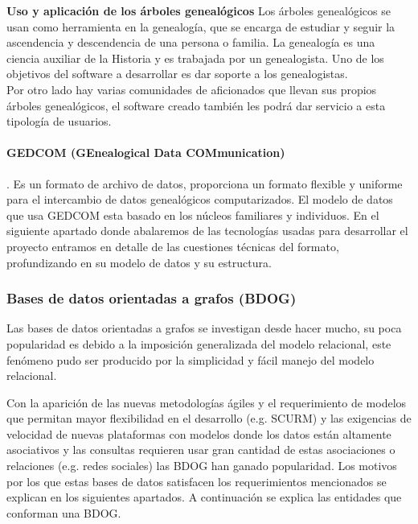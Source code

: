 \textbf{Uso y aplicación de los árboles genealógicos}\newline
Los árboles genealógicos se usan como herramienta en la genealogía, que se encarga de estudiar y seguir la ascendencia y descendencia de una persona o familia. La genealogía es una ciencia auxiliar de la Historia y es trabajada por un genealogista. Uno de los objetivos del software a desarrollar es dar soporte a los genealogistas.\\ Por otro lado hay varias comunidades de aficionados que llevan sus propios árboles genealógicos, el software creado también les podrá dar servicio a esta tipología de usuarios.

\paragraph{GEDCOM \cite{aboutGEDCOM} (\textbf{GE}nealogical \textbf{D}ata \textbf{COM}munication)}.\newline
Es un formato de archivo de datos, proporciona un formato flexible y uniforme para el intercambio de datos genealógicos computarizados. El modelo de datos que usa GEDCOM esta basado en los núcleos familiares y individuos. En el siguiente apartado donde abalaremos de las tecnologías usadas para desarrollar el proyecto entramos en detalle de las cuestiones técnicas del formato, profundizando en su modelo de datos y su estructura.

\subsubsection{Bases de datos orientadas a grafos (BDOG)}
\label{sec:bdog}
Las bases de datos orientadas a grafos se investigan desde hacer mucho, su poca popularidad es debido a la imposición generalizada del modelo relacional, este fenómeno pudo ser producido por la simplicidad y fácil manejo del modelo relacional.

Con la aparición de las nuevas metodologías ágiles y el requerimiento de modelos que permitan mayor flexibilidad en el desarrollo (e.g. SCURM) y las exigencias de velocidad de nuevas plataformas con modelos donde los datos están altamente asociativos y las consultas requieren usar gran cantidad de estas asociaciones o relaciones (e.g. redes sociales) las BDOG han ganado popularidad. Los motivos por los que estas bases de datos satisfacen los requerimientos mencionados se explican en los siguientes apartados. A continuación se explica las entidades que conforman una BDOG.

